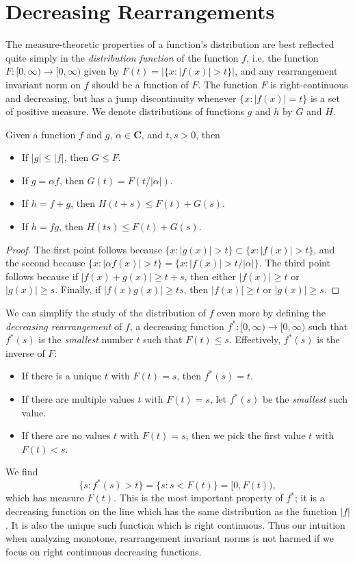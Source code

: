 \section{Decreasing Rearrangements}

 The measure-theoretic properties of a function's distribution are best reflected quite simply in the \emph{distribution function} of the function $f$, i.e. the function $F: [0,\infty) \to [0,\infty)$ given by $F(t) = |\{ x : |f(x)| > t \}|$, and any rearrangement invariant norm on $f$ should be a function of $F$. The function $F$ is right-continuous and decreasing, but has a jump discontinuity whenever $\{ x : |f(x)| = t \}$ is a set of positive measure. We denote distributions of functions $g$ and $h$ by $G$ and $H$.

\begin{lemma}
  Given a function $f$ and $g$, $\alpha \in \mathbf{C}$, and $t,s > 0$, then
  \begin{itemize}
    \item If $|g| \leq |f|$, then $G \leq F$.
    \item If $g = \alpha f$, then $G(t) = F(t/|\alpha|)$.
    \item If $h = f + g$, then $H(t+s) \leq F(t) + G(s)$.
    \item If $h = fg$, then $H(ts) \leq F(t) + G(s)$.
  \end{itemize}
\end{lemma}
\begin{proof}
    The first point follows because $\{ x : |g(x)| > t \} \subset \{ x : |f(x)| > t \}$, and the second because $\{ x : |\alpha f(x)| > t \} = \{ x : |f(x)| > t/|\alpha| \}$. The third point follows because if $|f(x) + g(x)| \geq t + s$, then either $|f(x)| \geq t$ or $|g(x)| \geq s$. Finally, if $|f(x) g(x)| \geq ts$, then $|f(x)| \geq t$ or $|g(x)| \geq s$.
\end{proof}

We can simplify the study of the distribution of $f$ even more by defining the \emph{decreasing rearrangement} of $f$, a decreasing function $f^*: [0,\infty) \to [0,\infty)$ such that $f^*(s)$ is the \emph{smallest} number $t$ such that $F(t) \leq s$. Effectively, $f^*(s)$ is the inverse of $F$:
%
\begin{itemize}
    \item If there is a unique $t$ with $F(t) = s$, then $f^*(s) = t$.
    \item If there are multiple values $t$ with $F(t) = s$, let $f^*(s)$ be the \emph{smallest} such value.
    \item If there are no values $t$ with $F(t) = s$, then we pick the first value $t$ with $F(t) < s$.
\end{itemize}
%
We find
%
\[ \{ s : f^*(s) > t \} = \{ s : s < F(t) \} = [0,F(t)), \]
%
which has measure $F(t)$. This is the most important property of $f^*$; it is a decreasing function on the line which has the same distribution as the function $|f|$. It is also the unique such function which is right continuous. Thus our intuition when analyzing monotone, rearrangement invariant norms is not harmed if we focus on right continuous decreasing functions.

